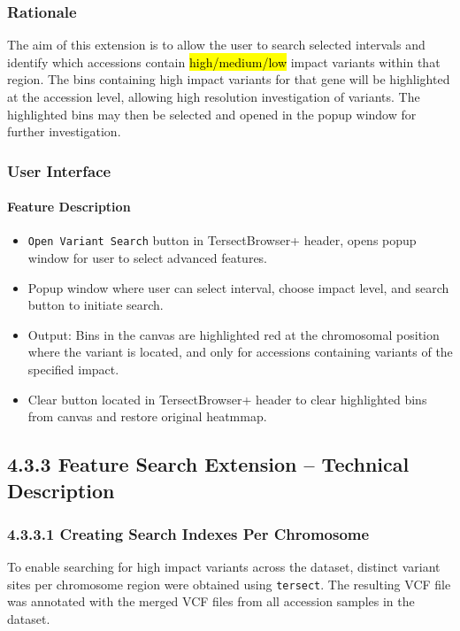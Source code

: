 \documentclass[12pt]{article}
\begin{document}
\subsubsection{Rationale}
The aim of this extension is to allow the user to search selected intervals and identify which accessions contain \hl{high/medium/low} impact variants within that region. The bins containing high impact variants for that gene will be highlighted at the accession level, allowing high resolution investigation of variants. The highlighted bins may then be selected and opened in the popup  window for further investigation.

\subsubsection{User Interface}
\paragraph{Feature Description}
\begin{itemize}
    \item \verb+Open Variant Search+ button in TersectBrowser+ header, opens popup window for user to select advanced features.
    \item Popup window where user can select interval, choose impact level, and search button to initiate search.
    \item Output: Bins in the canvas are highlighted red at the chromosomal position where the variant is located, and only for accessions containing variants of the specified impact.
    \item Clear button located in TersectBrowser+ header to clear highlighted bins from canvas and restore original heatmmap.
\end{itemize}

\subsection*{4.3.3 Feature Search Extension – Technical Description}

\subsubsection*{4.3.3.1 Creating Search Indexes Per Chromosome}

To enable searching for high impact variants across the dataset, distinct variant sites per chromosome region were obtained using \texttt{tersect}. The resulting VCF file was annotated with the merged VCF files from all accession samples in the dataset.
\end{document}
